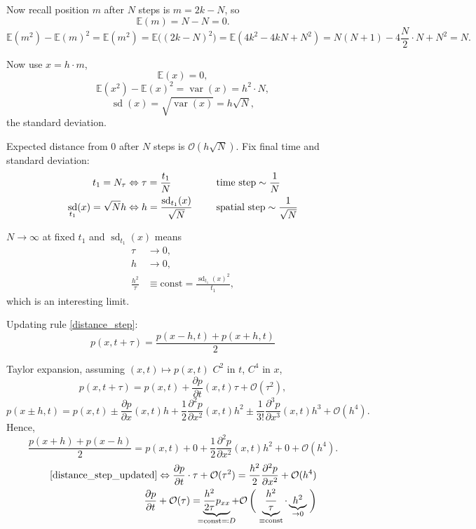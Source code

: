 \documentclass[12pt]{article}
\DeclareMathOperator{\var}{var}
\DeclareMathOperator{\sd}{sd}
\theoremstyle{definition}
\begin{document}
Now recall position $m$ after $N$ steps is $m=2k-N$, so
\[\mathbb{E}(m)=N-N=0.\]
\[\mathbb{E}(m^2)-\mathbb{E}(m)^2=\mathbb{E}(m^2)=\mathbb{E}\big((2k-N)^2\big)=\mathbb{E}(4k^2-4kN+N^2)=N(N+1)-4\frac{N}{2}\cdot N+N^2=N.\]

Now use $x=h\cdot m$,
\[\mathbb{E}(x)=0,\]
\[\mathbb{E}(x^2)-\mathbb{E}(x)^2=\var(x)=h^2\cdot N,\]
\[\sd(x)=\sqrt{\var(x)}=h\sqrt{N},\]
the standard deviation.

Expected distance from $0$ after $N$ steps is $\mathcal{O}(h\sqrt{N})$. Fix final time and standard deviation:
\begin{alignat*}{2}
t_1=N_{\tau}&\Leftrightarrow\tau=\frac{t_1}{N}&&\text{time step}\sim\frac{1}{N}\\
\sd_{t_1}(x)=\sqrt{N}h&\Leftrightarrow h=\frac{\sd_{t_1}(x)}{\sqrt{N}}\hspace{5mm}&&\text{spatial step}\sim\frac{1}{\sqrt{N}}
\end{alignat*}

$N\to\infty$ at fixed $t_1$ and $\sd_{t_1}(x)$ means
\begin{equation}\tag{$*$}\label{limit_RW}
\begin{split}
\tau&\to0,\\
h&\to0,\\
\frac{h^2}{\tau}&\equiv\text{const}=\frac{\sd_{t_1}(x)^2}{t_1},
\end{split}
\end{equation}
which is an interesting limit.

Updating rule \ref{distance_step}:
\begin{equation}\tag{U}\label{distance_step_updated}
p(x,t+\tau)=\frac{p(x-h,t)+p(x+h,t)}{2}
\end{equation}

Taylor expansion, assuming $(x,t)\mapsto p(x,t)$ $C^2$ in $t$, $C^4$ in $x$,
\[p(x,t+\tau)=p(x,t)+\frac{\partial p}{\partial t}(x,t)\tau+\mathcal{O}(\tau^2),\]
\[p(x\pm h,t)=p(x,t)\pm\frac{\partial p}{\partial x}(x,t)h+\frac{1}{2}\frac{\partial^2p}{\partial x^2}(x,t)h^2\pm\frac{1}{3!}\frac{\partial^3p}{\partial x^3}(x,t)h^3+\mathcal{O}(h^4).\]
Hence,
\[\frac{p(x+h)+p(x-h)}{2}=p(x,t)+0+\frac{1}{2}\frac{\partial^2p}{\partial x^2}(x,t)h^2+0+\mathcal{O}(h^4).\]
\begin{align*}
\text{\eqref{distance_step_updated}}\Leftrightarrow\frac{\partial p}{\partial t}\cdot\tau+\mathcal{O}(\tau^2)=\frac{h^2}{2}\frac{\partial^2p}{\partial x^2}+\mathcal{O}(h^4)\\
\frac{\partial p}{\partial t}+\mathcal{O}(\tau)=\underbrace{\frac{h^2}{2\tau}p_{xx}}_{\mathclap{=\text{const}\eqqcolon D}}+\mathcal{O}\left(\vphantom{\frac{h^2}{\tau}}\right.\underbrace{\frac{h^2}{\tau}}_{\equiv\text{const}}\cdot\underbrace{h^2}_{\rightarrow0}\left.\vphantom{\frac{h^2}{\tau}}\right)
\end{align*}
\end{document}
